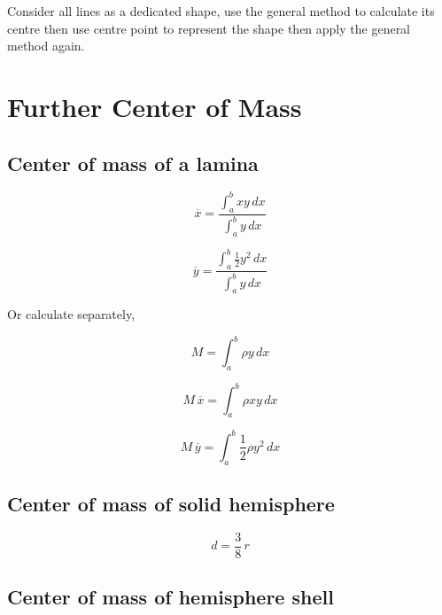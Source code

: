 \documentclass[a4paper,9pt]{scrartcl}
\begin{document}
    Consider all lines as a dedicated shape, use the general method to calculate its centre then use centre point to represent the shape then apply the general method again.


    \section{Further Center of Mass}

    \subsection{Center of mass of a lamina}

    \begin{displaymath}
        \overline{x} = \frac{\int_{a}^{b} xy \,dx}{\int_{a}^{b} y \,dx}
    \end{displaymath}

    \begin{displaymath}
        \overline{y} = \frac{\int_{a}^{b} \frac{1}{2}y^2 \,dx}{\int_{a}^{b} y \,dx}
    \end{displaymath}

    Or calculate separately,

    \begin{displaymath}
        M = \int_{a}^{b} {\rho}y \,dx
    \end{displaymath}

    \begin{displaymath}
        M\,\overline{x} = \int_{a}^{b} {\rho}xy \,dx
    \end{displaymath}

    \begin{displaymath}
        M\,\overline{y} = \int_{a}^{b} \frac{1}{2} {\rho}y^2 \,dx
    \end{displaymath}

    \subsection{Center of mass of solid hemisphere}

    \begin{displaymath}
        d = \frac{3}{8}\,r
    \end{displaymath}

    \subsection{Center of mass of hemisphere shell}
\end{document}
